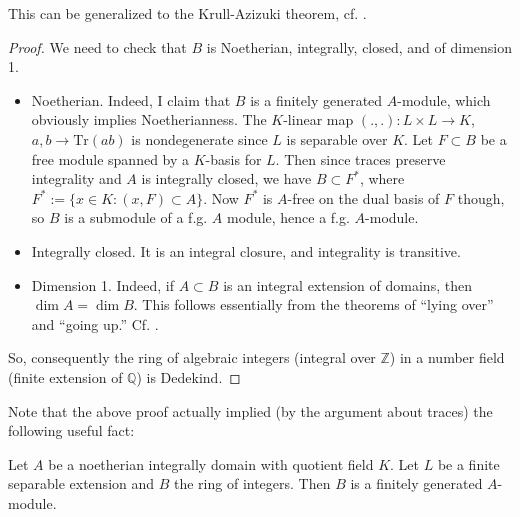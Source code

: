 This can be generalized to the Krull-Azizuki theorem, cf. \cite{Bo68}.

\begin{proof}  We need to check that $B$ is Noetherian, integrally, closed, and of dimension 1.

\begin{itemize}
\item Noetherian.  Indeed, I claim that $B$ is a finitely generated $A$-module, which obviously implies Noetherianness.  The $K$-linear map $(.,.): L \times L \to K$, $a,b \to \mathrm{Tr}(ab)$ is nondegenerate since $L$ is separable over $K$.  Let $F \subset B$ be a free module spanned by a $K$-basis for $L$.  Then since traces preserve integrality and $A$ is integrally closed, we have $B \subset F^*$, where $F^* := \{ x \in K: (x,F) \subset A \}$.  Now $F^*$ is $A$-free on the dual basis of $F$ though, so $B$ is a submodule of a f.g. $A$ module, hence a f.g. $A$-module.
\item Integrally closed.  It is an integral closure, and integrality is transitive.
\item Dimension 1.  Indeed, if $A \subset B$ is an integral extension of
domains, then $\dim A = \dim B$. This follows essentially from the theorems of
``lying over'' and ``going up.'' Cf. \cite{Ei95}.
\end{itemize}

So, consequently the ring of algebraic integers (integral over $\mathbb{Z}$) in a number field (finite extension of $\mathbb{Q}$) is Dedekind.
\end{proof}

Note that the above proof actually implied (by the argument about traces) the following useful fact:
\begin{proposition} Let $A$ be a noetherian integrally domain with quotient field $K$.  Let $L$ be a finite separable extension and $B$ the ring of integers. Then $B$ is a finitely generated $A$-module.
\end{proposition}

